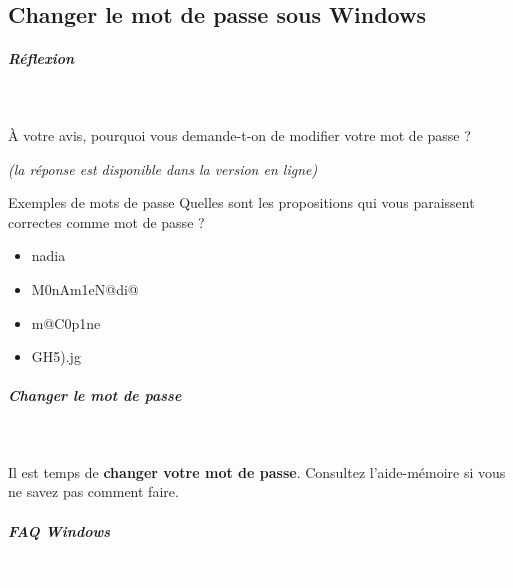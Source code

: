 \documentclass[a4paper,11pt]{article}
\begin{document}
\subsection{Changer le mot de passe sous Windows}


\subparagraph{Réflexion}
\textcolor{white}{.} 
\par
				
\`A votre avis, pourquoi vous demande-t-on de modifier votre mot de passe ?
				
\par
{\footnotesize\emph{(la r\'eponse est disponible dans la version en ligne)}\par} 
			
\begin{Exercice}{Exemples de mots de passe} 		
Quelles sont les propositions qui vous paraissent correctes comme mot de passe ?
\begin{itemize} 
  \item[ \ding{"6F} ] nadia
  \item[ \ding{"6F} ] M0nAm1eN@di@
  \item[ \ding{"6F} ] m@C0p1ne
  \item[ \ding{"6F} ] GH5).jg
 \end{itemize} 
\end{Exercice} 
 
\subparagraph{Changer le mot de passe} 
		
\textcolor{white}{.} 
\par
				
\par
        
Il est  temps de \textbf{changer votre mot de passe}. Consultez l'aide-m\'emoire si vous ne savez pas comment faire. 
				
\par
        
			
\subparagraph{FAQ Windows} 
		
\textcolor{white}{.} \par
				
\end{document}

